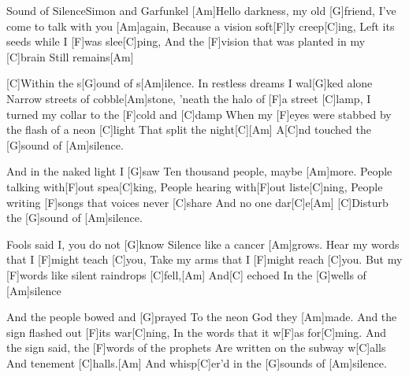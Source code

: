 \documentclass[../main.tex]{subfiles}
\begin{document}
\begin{song}[6]{Sound of Silence}{Simon and Garfunkel}{}
[Am]Hello darkness, my old [G]friend,
I've come to talk with you [Am]again,
Because a vision soft[F]ly creep[C]ing,
Left its seeds while I [F]was slee[C]ping,
And the [F]vision that was planted in my [C]brain
Still remains[Am]{\hh}

[C]Within the s[G]ound of s[Am]ilence.
In restless dreams I wal[G]ked alone
Narrow streets of cobble[Am]stone,
'neath the halo of [F]a street [C]lamp,
I turned my collar to the [F]cold and [C]damp
When my [F]eyes were stabbed by the flash of a neon [C]light
That split the night[C]{\hh}[Am]{\hh}
A[C]nd touched the [G]sound of [Am]silence.

And in the naked light I [G]saw
Ten thousand people, maybe [Am]more.
People talking with[F]out spea[C]king,
People hearing with[F]out liste[C]ning,
People writing [F]songs that voices never [C]share
And no one dar[C]e[Am]
[C]Disturb the [G]sound of [Am]silence.

Fools said I, you do not [G]know
Silence like a cancer [Am]grows.
Hear my words that I [F]might teach [C]you,
Take my arms that I [F]might reach [C]you.
But my [F]words like silent raindrops [C]fell,[Am]
And[C] echoed
In the [G]wells of [Am]silence

And the people bowed and [G]prayed
To the neon God they [Am]made.
And the sign flashed out [F]its war[C]ning,
In the words that it w[F]as for[C]ming.
And the sign said, the [F]words of the prophets
Are written on the subway w[C]alls
And tenement [C]halls.[Am]
And whisp[C]er'd in the [G]sounds of [Am]silence.
\end{song}
\end{document}
